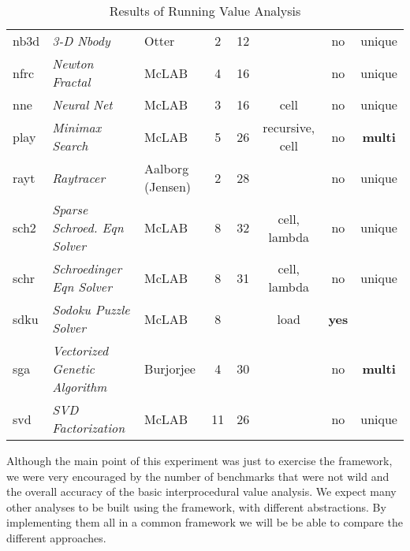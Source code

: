 \begin{table}[htbp]
\begin{center}
\begin{scriptsize}
\begin{tabular}{|l|l|l|c|c|c|c|c|}
nb3d & \textit{3-D Nbody}                    & Otter              & 2      & 12      &          & no   & unique  \\
nfrc & \textit{Newton Fractal}               & McLAB              & 4      & 16      &          & no   & unique  \\
nne  & \textit{Neural Net}                   & McLAB              & 3      & 16      & cell     & no   & unique  \\
play & \textit{Minimax Search}               & McLAB              & 5      & 26      & recursive, cell & no & \textbf{multi} \\ 
rayt & \textit{Raytracer}                    & Aalborg (Jensen)   & 2      & 28      &          & no   & unique  \\ 
sch2 & \textit{Sparse Schroed. Eqn Solver}   & McLAB              & 8      & 32      & cell, lambda & no & unique\\
schr & \textit{Schroedinger Eqn Solver}      & McLAB              & 8      & 31      & cell, lambda & no & unique\\
sdku & \textit{Sodoku Puzzle Solver}         & McLAB              & 8      &         & load      & \textbf{yes}  &        \\
sga  & \textit{Vectorized Genetic Algorithm} & Burjorjee          & 4      & 30      &           & no   & \textbf{multi}  \\ 
svd  & \textit{SVD Factorization}            & McLAB              & 11     & 26      &           & no   & unique     \\ \hline
\end{tabular}
\end{scriptsize}
\end{center}
\caption{Results of Running Value Analysis}
\label{Fig:Bench}
\end{table}

Although the main point of this experiment was just to exercise the framework,
we were very encouraged by
the number of benchmarks that were not wild and the overall accuracy of the
basic interprocedural value analysis.   We expect many other analyses to be
built using the framework, with different abstractions.  By implementing them
all in a common framework we will be be able to compare the different
approaches.
